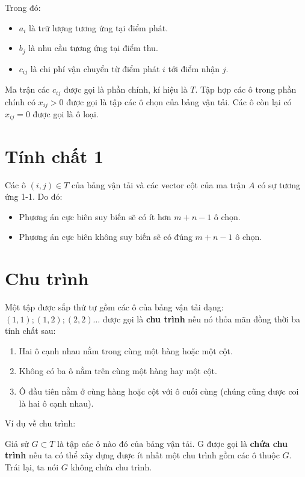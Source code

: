 \noindent Trong đó: 
\begin{itemize}
    \item $a_i$ là trữ lượng tương ứng tại điểm phát.
    \item $b_j$ là nhu cầu tương ứng tại điểm thu.
    \item $c_{ij}$ là chi phí vận chuyển từ điểm phát $i$ tới điểm nhận $j$.
\end{itemize}

Ma trận các $c_{ij}$ được gọi là phần chính, kí hiệu là $T$. Tập hợp các ô trong phần chính có $x_{ij} > 0$ được gọi là tập các ô chọn của bảng vận tải. Các ô còn lại có $x_{ij} = 0$ được gọi là ô loại.

\section*{Tính chất 1}

Các ô $(i,j) \in T$ của bảng vận tải và các vector cột của ma trận $A$ có sự tương ứng 1-1. Do đó: 
\begin{itemize}
    \item Phương án cực biên suy biến sẽ có ít hơn $m+n -1$ ô chọn.
    \item Phương án cực biên không suy biến sẽ có đúng $m+n- 1$ ô chọn.
\end{itemize}

\section*{Chu trình}

Một tập được sắp thứ tự gồm các ô của bảng vận tải dạng: $(1,1); (1,2); (2,2) \ldots$ được gọi là \textbf{chu trình} nếu nó thỏa mãn đồng thời ba tính chất sau: 
\begin{enumerate}
    \item Hai ô cạnh nhau nằm trong cùng một hàng hoặc một cột.
    \item Không có ba ô nằm trên cùng một hàng hay một cột.
    \item Ô đầu tiên nằm ở cùng hàng hoặc cột với ô cuối cùng (chúng cũng được coi là hai ô cạnh nhau).
\end{enumerate}

\noindent Ví dụ về chu trình:

\vspace{1em}

Giả sử $G \subset T$ là tập các ô nào đó của bảng vận tải. G được gọi là \textbf{chứa chu trình} nếu ta có thể xây dựng được ít nhất một chu trình gồm các ô thuộc $G$. Trái lại, ta nói $G$ không chứa chu trình.

